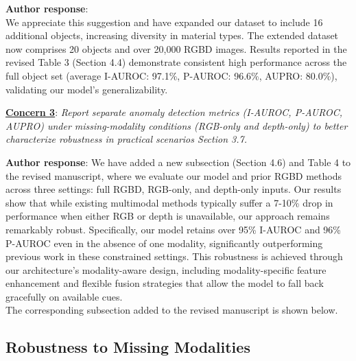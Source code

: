 \documentclass[a4paper,fleqnn]{cas-sc}
\begin{document}
\noindent \textbf{Author response}: \\
We appreciate this suggestion and have expanded our dataset to include 16 additional objects, increasing diversity in material types. The extended dataset now comprises 20 objects and over 20,000 RGBD images. Results reported in the revised Table 3 (Section 4.4) demonstrate consistent high performance across the full object set (average I-AUROC: 97.1\%, P-AUROC: 96.6\%, AUPRO: 80.0\%), validating our model's generalizability. 

\vspace{1em}

\noindent \textbf{\underline{Concern 3}}: \textit{Report separate anomaly detection metrics (I-AUROC, P-AUROC, AUPRO) under missing-modality conditions (RGB-only and depth-only) to better characterize robustness in practical scenarios Section 3.7. \\}

\noindent \textbf{Author response}: We have added a new subsection (Section 4.6) and Table 4 to the revised manuscript, where we evaluate our model and prior RGBD methods across three settings: full RGBD, RGB-only, and depth-only inputs. Our results show that while existing multimodal methods typically suffer a 7-10\% drop in performance when either RGB or depth is unavailable, our approach remains remarkably robust. Specifically, our model retains over 95\% I-AUROC and 96\% P-AUROC even in the absence of one modality, significantly outperforming previous work in these constrained settings. This robustness is achieved through our architecture's modality-aware design, including modality-specific feature enhancement and flexible fusion strategies that allow the model to fall back gracefully on available cues. \\

The corresponding subsection added to the revised manuscript is shown below. 

\setcounter{section}{4}
\setcounter{subsection}{5}

\subsection{Robustness to Missing Modalities}

\renewcommand{\thetable}{4}
\end{document}
